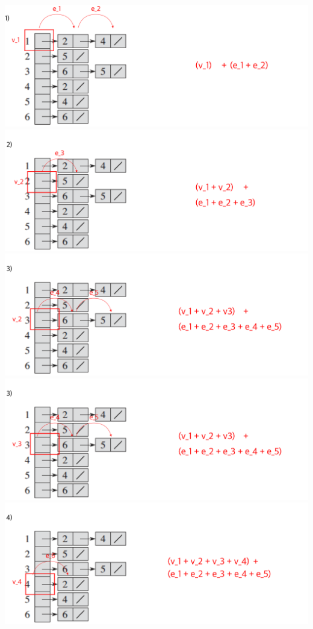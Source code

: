 \documentclass[12pt]{article}
\begin{document}
\begin{enumerate}[1.]
\begin{itemize}
        \begin{center}
        \includegraphics[width=\linewidth]{images/worksheet_4_solution_11.png}
        \includegraphics[width=\linewidth]{images/worksheet_4_solution_12.png}
        \includegraphics[width=\linewidth]{images/worksheet_4_solution_13.png}
        \includegraphics[width=\linewidth]{images/worksheet_4_solution_14.png}
        \includegraphics[width=\linewidth]{images/worksheet_4_solution_15.png}

\end{center}
\end{itemize}
\end{enumerate}
\end{document}
